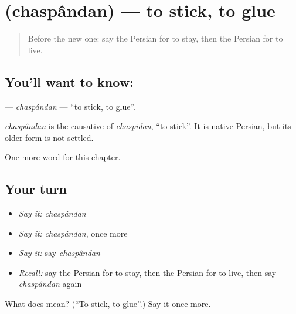 \section[\texorpdfstring{\fa{چسباندن} (chaspândan)}{چسباندن (chaspândan)}]{ (chaspândan) — to stick, to glue}

\label{lesson:FA-C135-chaspandan}



\begin{quote}
Before the new one: say the Persian for to stay, then the Persian for to live.
\end{quote}

\subsection*{You'll want to know: }
\textbf{} — \emph{chaspândan} — \textquotedblleft{}to stick, to glue\textquotedblright{}.

\begin{cousinweb}
\emph{chaspândan} is the causative of \emph{chaspidan}, \textquotedblleft{}to stick\textquotedblright{}. It is native Persian, but its older form is not settled.
\end{cousinweb}

\begin{grammarlens}[title={What you've built}]
One more word for this chapter.
\end{grammarlens}

\subsection*{Your turn}
\begin{itemize}
\raggedright
  \item \emph{Say it:} \emph{chaspândan}
  \item \emph{Say it:} \emph{chaspândan}, once more
  \item \emph{Say it:} say \emph{chaspândan}
  \item \emph{Recall:} say the Persian for to stay, then the Persian for to live, then say \emph{chaspândan} again
\end{itemize}

\begin{tcolorbox}[breakable,colback=teal!4,colframe=teal!35!black,title={Before you move on}]
What does  mean? (\textquotedblleft{}To stick, to glue\textquotedblright{}.) Say it once more.
\end{tcolorbox}
